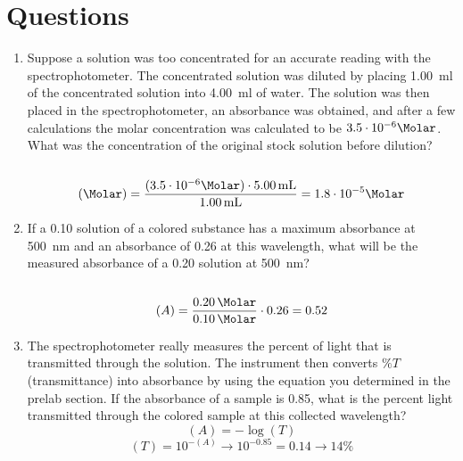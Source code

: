 \documentclass{article}
\begin{document}
    \section{Questions}
        \begin{enumerate}
            \item Suppose a solution was too concentrated for an accurate reading
            with the spectrophotometer. The concentrated solution was diluted
            by placing \SI{1.00}{\ml} of the concentrated solution into
            \SI{4.00}{\ml} of water. The solution was then placed in the
            spectrophotometer, an absorbance was obtained, and after a few
            calculations the molar concentration was calculated to be
            \(3.5\cdot10^{-6}\si\Molar\). What was the concentration of the
            original stock solution before dilution? \\\\
            \[(\si\Molar) = \frac{(3.5\cdot10^{-6}\si\Molar)\cdot\SI{5.00}{\ml}}{\SI{1.00}{\ml}} = 1.8\cdot10^{-5}\si\Molar\]
            \item If a \SI{0.10}{\Molar} solution of a colored substance has a
            maximum absorbance at \SI{500}{\nm} and an absorbance of 0.26
            at this wavelength, what will be the measured absorbance of a
            \SI{0.20}{\Molar} solution at \SI{500}{\nm}? \\\\
            \[(A) = \frac{\SI{0.20}{\Molar}}{\SI{0.10}{\Molar}}\cdot0.26 = 0.52\]
            \item The spectrophotometer really measures the percent of light
            that is transmitted through the solution. The instrument then converts
            \(\%T\) (transmittance) into absorbance by using the equation you
            determined in the prelab section. If the absorbance of a sample is
            0.85, what is the percent light transmitted through the colored
            sample at this collected wavelength?
            \[(A) = -\log{(T)}\]
            \[(T) = 10^{-(A)}\to10^{-0.85} = 0.14\to14\%\]
        \end{enumerate}
\end{document}
